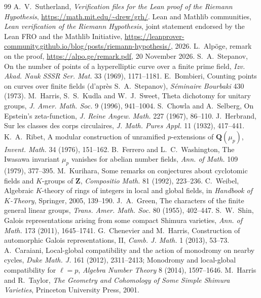 \documentclass[11pt]{article}
\begin{document}
\begin{thebibliography}{99}\small
{} A.~V.~Sutherland, \emph{Verification files for the Lean proof of the Riemann Hypothesis}, \url{https://math.mit.edu/~drew/grh/}.
 Lean and Mathlib communities, \emph{Lean verification of the Riemann Hypothesis}, joint statement endorsed by the Lean FRO and the Mathlib Initiative, \url{https://leanprover-community.github.io/blog/posts/riemann-hypothesis/}, 2026.
 L.~Alpöge, remark on the proof, \url{https://alpo.ge/remark.pdf}, 20 November 2026.
 S.~A.~Stepanov, On the number of points of a hyperelliptic curve over a finite prime field, \emph{Izv. Akad. Nauk SSSR Ser. Mat.} 33 (1969), 1171--1181.
 E.~Bombieri, Counting points on curves over finite fields (d'après S.~A.~Stepanov), \emph{Séminaire Bourbaki} 430 (1973).
 M.~Harris, S.~S.~Kudla and W.~J.~Sweet, Theta dichotomy for unitary groups, \emph{J. Amer. Math. Soc.} 9 (1996), 941--1004.
 S.~Chowla and A.~Selberg, On Epstein's zeta-function, \emph{J. Reine Angew. Math.} 227 (1967), 86--110.
 J.~Herbrand, Sur les classes des corps circulaires, \emph{J. Math. Pures Appl.} 11 (1932), 417--441.
 K.~A.~Ribet, A modular construction of unramified $p$-extensions of $\mathbf{Q}(\mu_p)$, \emph{Invent. Math.} 34 (1976), 151--162.
 B.~Ferrero and L.~C.~Washington, The Iwasawa invariant $\mu_p$ vanishes for abelian number fields, \emph{Ann. of Math.} 109 (1979), 377--395.
 M.~Kurihara, Some remarks on conjectures about cyclotomic fields and $K$-groups of $\mathbf{Z}$, \emph{Compositio Math.} 81 (1992), 223--236.
 C.~Weibel, Algebraic $K$-theory of rings of integers in local and global fields, in \emph{Handbook of $K$-Theory}, Springer, 2005, 139--190.
 J.~A.~Green, The characters of the finite general linear groups, \emph{Trans. Amer. Math. Soc.} 80 (1955), 402--447.
 S.~W.~Shin, Galois representations arising from some compact Shimura varieties, \emph{Ann. of Math.} 173 (2011), 1645--1741.
 G.~Chenevier and M.~Harris, Construction of automorphic Galois representations, II, \emph{Camb. J. Math.} 1 (2013), 53--73.
 A.~Caraiani, Local-global compatibility and the action of monodromy on nearby cycles, \emph{Duke Math. J.} 161 (2012), 2311--2413; Monodromy and local-global compatibility for $\ell=p$, \emph{Algebra Number Theory} 8 (2014), 1597--1646.
 M.~Harris and R.~Taylor, \emph{The Geometry and Cohomology of Some Simple Shimura Varieties}, Princeton University Press, 2001.

\end{thebibliography}
\end{document}
